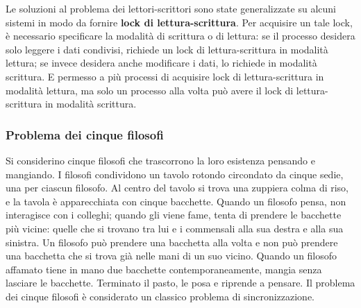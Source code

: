 \documentclass[11pt,a4paper]{article}
\begin{document}
Le soluzioni al problema dei lettori-scrittori sono state generalizzate su alcuni sistemi
in modo da fornire \textbf{lock di lettura-scrittura}. Per acquisire un tale lock, è necessario specificare la modalità di scrittura o di lettura: se il processo desidera solo leggere i dati condivisi,
richiede un lock di lettura-scrittura in modalità lettura; se invece desidera anche modificare
i dati, lo richiede in modalità scrittura. E permesso a più processi di acquisire lock di lettura-scrittura in modalità lettura, ma solo un processo alla volta può avere il lock di lettura-scrittura in modalità scrittura.

\subsubsection{Problema dei cinque filosofi}
Si considerino cinque filosofi che trascorrono la loro esistenza pensando e mangiando. I fi­losofi condividono un tavolo rotondo circondato da cinque sedie, una per ciascun filosofo.
Al centro del tavolo si trova una zuppiera colma di riso, e la tavola è apparecchiata con cinque bacchette. Quando un filosofo pensa, non interagisce con i colleghi;
quando gli viene fame, tenta di prendere le bacchette più vicine: quelle che si trovano tra lui
e i commensali alla sua destra e alla sua sinistra. Un filosofo può prendere una bacchetta al­la volta e non può prendere una bacchetta che si trova già nelle mani di un suo vicino.
Quando un filosofo affamato tiene in mano due bacchette contemporaneamente, mangia
senza lasciare le bacchette. Terminato il pasto, le posa e riprende a pensare.
Il problema dei cinque filosofi è considerato un classico problema di sincronizzazione.
\end{document}
